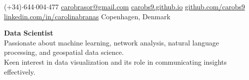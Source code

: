 \documentclass{resume}
\begin{document}
\begin{center}
    \contact
        {(+34)$\cdot$644$\cdot$004$\cdot$477}
        {\href{mailto://carobrasor@gmail.com}{carobrasor@gmail.com}}
        {\href{https://carobs9.github.io/}{carobs9.github.io}}
        {\href{https://github.com/carobs9}{github.com/carobs9}}
        {\href{https://www.linkedin.com/in/carolinabranas/}{linkedin.com/in/carolinabranas}}
        {Copenhagen, Denmark}
\end{center}

\begin{center}
    \textbf{Data Scientist} \\
    Passionate about machine learning, network analysis, natural language processing, and geospatial data science. \\
    Keen interest in data visualization and its role in communicating insights effectively.
\end{center}
\end{document}
